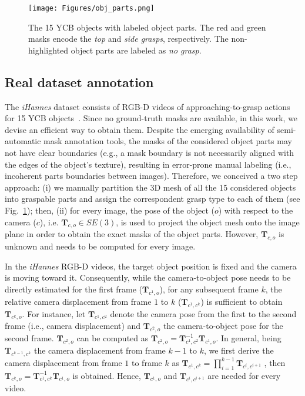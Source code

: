 \begin{figure}
    \centering
    \vspace{+0.30cm}
    \texttt{[image: Figures/obj\_parts.png]}
    \caption{The 15 YCB objects with labeled object parts. The red and green masks encode the \textit{top} and \textit{side grasps}, respectively. 
    The non-highlighted object parts are labeled as \textit{no grasp}.  
    }
    \vspace{-0.60cm}
    \label{fig:obj_parts}
\end{figure}

\subsection{Real dataset annotation}
\label{sec:real_dataset_annotation}
The \textit{iHannes} dataset consists of RGB-D videos of approaching-to-grasp actions for 15 YCB objects~\cite{calli2015}. Since no ground-truth masks are available, in this work, we devise an efficient way to obtain them. Despite the emerging availability of semi-automatic mask annotation tools, the masks of the considered object parts may not have clear boundaries (e.g., a mask boundary is not necessarily aligned with the edges of the object's texture), resulting in error-prone manual labeling (i.e., incoherent parts boundaries between images). Therefore, we conceived a two step approach: (i) we manually partition the 3D mesh of all the 15 considered objects into graspable parts and assign the correspondent grasp type to each of them (see Fig.~\ref{fig:obj_parts}); then, (ii) for every image, the pose of the object ($o$) with respect to the camera ($c$), i.e. $\mathbf{T}_{c,o} \in SE(3)$, is used to project the object mesh onto the image plane in order to obtain the exact masks of the object parts. However, $\mathbf{T}_{c,o}$ is unknown and needs to be computed for every image.

In the \textit{iHannes} RGB-D videos, the target object position is fixed and the camera is moving toward it. Consequently, while the camera-to-object pose needs to be directly estimated for the first frame ($\mathbf{T}_{c^1,o}$), for any subsequent frame $k$, the relative camera displacement from frame $1$ to $k$ ($\mathbf{T}_{c^1,c^k}$) is sufficient to obtain $\mathbf{T}_{c^k,o}$. For instance, let $\mathbf{T}_{c^1,c^2}$ denote the camera pose from the first to the second frame (i.e., camera displacement) and $\mathbf{T}_{c^2,o}$ the camera-to-object pose for the second frame. $\mathbf{T}_{c^2,o}$ can be computed as $\mathbf{T}_{c^2,o} = \mathbf{T}_{c^1,c^2}^{-1} \mathbf{T}_{c^1,o}$. In general, being $\mathbf{T}_{c^{k-1},c^k}$ the camera displacement from frame $k-1$ to $k$, we first derive the camera displacement from frame $1$ to frame $k$ as $\mathbf{T}_{c^1,c^k} = \prod_{i=1}^{k-1}\mathbf{T}_{c^i, c^{i+1}}$ , then $\mathbf{T}_{c^k,o} = \mathbf{T}_{c^1,c^k}^{-1} \mathbf{T}_{c^1,o}$ is obtained. Hence, $\mathbf{T}_{c^1,o}$ and $\mathbf{T}_{c^i,c^{i+1}}$ are needed for every video.

